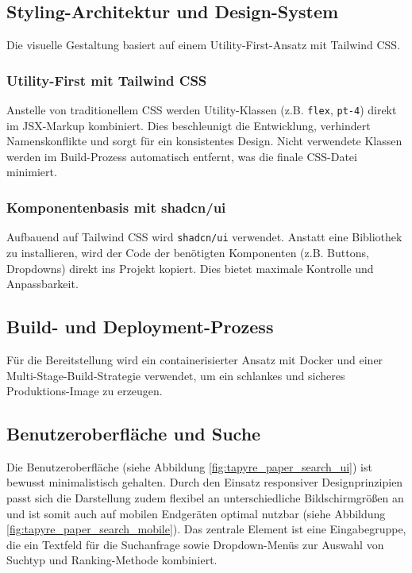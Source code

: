 \subsection{Styling-Architektur und Design-System}
Die visuelle Gestaltung basiert auf einem Utility-First-Ansatz mit Tailwind CSS.

\subsubsection{Utility-First mit Tailwind CSS}
Anstelle von traditionellem CSS werden Utility-Klassen (z.B. \texttt{flex}, \texttt{pt-4}) direkt im JSX-Markup kombiniert. Dies beschleunigt die Entwicklung, verhindert Namenskonflikte und sorgt für ein konsistentes Design. Nicht verwendete Klassen werden im Build-Prozess automatisch entfernt, was die finale CSS-Datei minimiert.

\subsubsection{Komponentenbasis mit shadcn/ui}
Aufbauend auf Tailwind CSS wird \texttt{shadcn/ui} verwendet. Anstatt eine Bibliothek zu installieren, wird der Code der benötigten Komponenten (z.B. Buttons, Dropdowns) direkt ins Projekt kopiert. Dies bietet maximale Kontrolle und Anpassbarkeit.

\subsection{Build- und Deployment-Prozess}
Für die Bereitstellung wird ein containerisierter Ansatz mit Docker und einer Multi-Stage-Build-Strategie verwendet, um ein schlankes und sicheres Produktions-Image zu erzeugen.



\subsection{Benutzeroberfläche und Suche}
Die Benutzeroberfläche (siehe Abbildung \ref{fig:tapyre_paper_search_ui}) ist bewusst minimalistisch gehalten. Durch den Einsatz responsiver Designprinzipien passt sich die Darstellung zudem flexibel an unterschiedliche Bildschirmgrößen an und ist somit auch auf mobilen Endgeräten optimal nutzbar (siehe Abbildung \ref{fig:tapyre_paper_search_mobile}). Das zentrale Element ist eine Eingabegruppe, die ein Textfeld für die Suchanfrage sowie Dropdown-Menüs zur Auswahl von Suchtyp und Ranking-Methode kombiniert.

